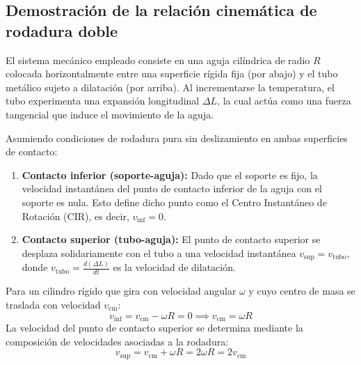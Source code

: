 
\begin{appendices}

\section{Demostración de la relación cinemática de rodadura doble}
\label{sec:anexo_cinematica}

El sistema mecánico empleado consiste en una aguja cilíndrica de radio $R$ colocada horizontalmente entre una superficie rígida fija (por abajo) y el tubo metálico sujeto a dilatación (por arriba). Al incrementarse la temperatura, el tubo experimenta una expansión longitudinal $\Delta L$, la cual actúa como una fuerza tangencial que induce el movimiento de la aguja.

Asumiendo condiciones de rodadura pura sin deslizamiento en ambas superficies de contacto:
\begin{enumerate}
    \item \textbf{Contacto inferior (soporte-aguja):} Dado que el soporte es fijo, la velocidad instantánea del punto de contacto inferior de la aguja con el soporte es nula. Esto define dicho punto como el Centro Instantáneo de Rotación (CIR), es decir, $v_{\text{inf}} = 0$.
    \item \textbf{Contacto superior (tubo-aguja):} El punto de contacto superior se desplaza solidariamente con el tubo a una velocidad instantánea $v_{\text{sup}} = v_{\text{tubo}}$, donde $v_{\text{tubo}} = \frac{d(\Delta L)}{dt}$ es la velocidad de dilatación.
\end{enumerate}

Para un cilindro rígido que gira con velocidad angular $\omega$ y cuyo centro de masa se traslada con velocidad $v_{\text{cm}}$:
\begin{equation}
    v_{\text{inf}} = v_{\text{cm}} - \omega R = 0 \implies v_{\text{cm}} = \omega R
    \label{eq:v_cm_anexo}
\end{equation}
La velocidad del punto de contacto superior se determina mediante la composición de velocidades asociadas a la rodadura:
\begin{equation}
    v_{\text{sup}} = v_{\text{cm}} + \omega R = 2\omega R = 2v_{\text{cm}}
    \label{eq:v_sup_anexo}
\end{equation}


\end{appendices}
